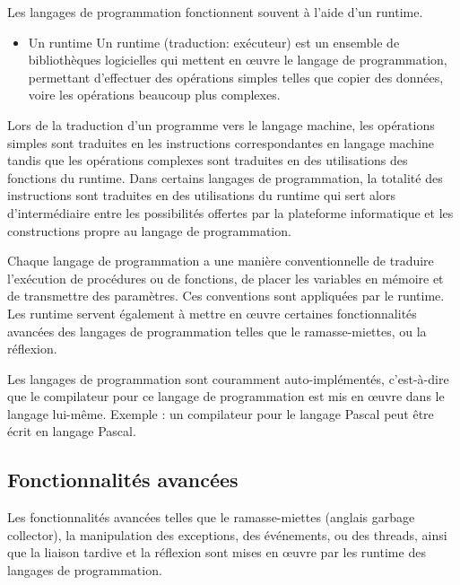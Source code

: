 \documentclass[a4paper,12pt]{article}
\begin{document}
Les langages de programmation fonctionnent souvent à l'aide d'un runtime.

\begin{itemize}[label=\textbullet]

\setlength{\itemindent}{-1.5em}

\item Un runtime
\newline Un runtime (traduction: exécuteur) est un ensemble de bibliothèques logicielles qui mettent en œuvre le langage de programmation, permettant d'effectuer des opérations simples telles que copier des données, voire les opérations beaucoup plus complexes\cite{scott}.

\end{itemize}

Lors de la traduction d'un programme vers le langage machine, les opérations simples sont traduites en les instructions correspondantes en langage machine tandis que les opérations complexes sont traduites en des utilisations des fonctions du runtime. Dans certains langages de programmation, la totalité des instructions sont traduites en des utilisations du runtime\cite{scott} qui sert alors d'intermédiaire entre les possibilités offertes par la plateforme informatique et les constructions propre au langage de programmation\cite{griffiths}.

Chaque langage de programmation a une manière conventionnelle de traduire l'exécution de procédures ou de fonctions, de placer les variables en mémoire et de transmettre des paramètres. Ces conventions sont appliquées par le runtime\cite{raghavan}. Les runtime servent également à mettre en œuvre certaines fonctionnalités avancées des langages de programmation telles que le ramasse-miettes, ou la réflexion\cite{scott}.

Les langages de programmation sont couramment auto-implémentés, c'est-à-dire que le compilateur pour ce langage de programmation est mis en œuvre dans le langage lui-même. Exemple : un compilateur pour le langage Pascal peut être écrit en langage Pascal\cite{diomidis}.

\subsection{Fonctionnalités avancées}

Les fonctionnalités avancées telles que le ramasse-miettes (anglais garbage collector), la manipulation des exceptions, des événements, ou des threads, ainsi que la liaison tardive et la réflexion sont mises en œuvre par les runtime des langages de programmation\cite{scott}.
\end{document}
